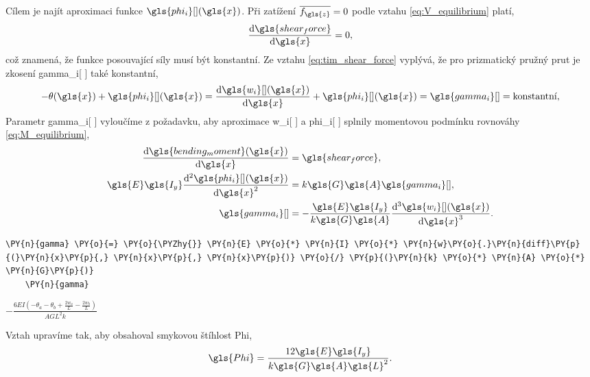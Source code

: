 \vspace{0.3cm} 
Cílem je najít aproximaci funkce $\gls{phi_i}[ ](\gls{x})$. Při zatížení $\overline{f_{\gls{z}}} = 0$ podle vztahu \ref{eq:V_equilibrium} platí,
\begin{equation*}
    \dv{\gls{shear_force}}{\gls{x}} = 0,
\end{equation*}
což znamená, že funkce posouvající síly musí být konstantní.
Ze vztahu \ref{eq:tim_shear_force} vyplývá, že pro prizmatický pružný prut je zkosení \gls{gamma_i}[ ] také konstantní,
\begin{equation}
    \label{eq:tim_dwdx_phi}
    -\theta(\gls{x}) + \gls{phi_i}[ ](\gls{x}) = \dv{\gls{w_i}[ ](\gls{x})}{\gls{x}} + \gls{phi_i}[ ](\gls{x}) = \gls{gamma_i}[ ]=\text{konstantní},
\end{equation}
Parametr \gls{gamma_i}[ ] vyloučíme z požadavku, aby aproximace \gls{w_i}[ ] a \gls{phi_i}[ ] splnily momentovou podmínku rovnováhy \ref{eq:M_equilibrium},
\begin{equation}
    \begin{split}
    \dv{\gls{bending_moment}(\gls{x})}{\gls{x}}  &= \gls{shear_force},\\
    \gls{E}\gls{I_y}\dv[2]{\gls{phi_i}[ ](\gls{x})}{\gls{x}} &= k \gls{G} \gls{A} \gls{gamma_i}[ ],\\
    \gls{gamma_i}[ ] &= - \frac{\gls{E}\gls{I_y}}{k \gls{G} \gls{A}} \dv[3]{\gls{w_i}[ ](\gls{x})}{\gls{x}}.
    \end{split}
\end{equation}
\begin{tcolorbox}[breakable, size=fbox, boxrule=1pt, pad at break*=1mm,colback=cellbackground, colframe=cellborder]
    \begin{Verbatim}[commandchars=\\\{\}]
    \PY{n}{gamma} \PY{o}{=} \PY{o}{\PYZhy{}} \PY{n}{E} \PY{o}{*} \PY{n}{I} \PY{o}{*} \PY{n}{w}\PY{o}{.}\PY{n}{diff}\PY{p}{(}\PY{n}{x}\PY{p}{,} \PY{n}{x}\PY{p}{,} \PY{n}{x}\PY{p}{)} \PY{o}{/} \PY{p}{(}\PY{n}{k} \PY{o}{*} \PY{n}{A} \PY{o}{*} \PY{n}{G}\PY{p}{)}
    \PY{n}{gamma}
    \end{Verbatim}
    \end{tcolorbox}
            
        
    $\displaystyle - \frac{6 E I \left(- \theta_{a} - \theta_{b} + \frac{2 w_{a}}{L} - \frac{2 w_{b}}{L}\right)}{A G L^{2} k}$

\vspace{0.3cm}
Vztah upravíme tak, aby obsahoval smykovou štíhlost \gls{Phi},
\begin{equation} \label{eq:tim_omega}
    \gls{Phi} = \frac{12\gls{E}\gls{I_y}}{k\gls{G}\gls{A}\gls{L}^2}.
\end{equation}
    
